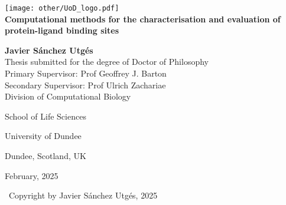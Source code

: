 \begin{titlepage}

	\begin{center}
	
		\texttt{[image: other/UoD\_logo.pdf]}\\[1.5cm]
		
		{\Huge \textbf{Computational methods for the characterisation and evaluation of protein-ligand binding sites}}\\[1.5cm]
		
		{\LARGE \textbf{Javier Sánchez Utgés}}\\[1.5cm]
		
		{\Large Thesis submitted for the degree of Doctor of Philosophy}\\[1.5cm]
		
		{\large Primary Supervisor: Prof Geoffrey J. Barton}\\[0.25cm]

		{\large Secondary Supervisor: Prof Ulrich Zachariae}\\[0.25cm]
		
		
		{\normalsize Division of Computational Biology}
		
		{\normalsize School of Life Sciences}
		
		{\normalsize University of Dundee}
		
		{\normalsize Dundee, Scotland, UK}
		
		{\normalsize February, 2025}
		
		\vfill
		
		{\small \textcopyright\ Copyright by Javier Sánchez Utgés, 2025}

	\end{center}
	
\end{titlepage}